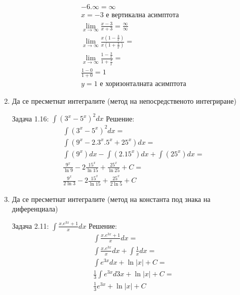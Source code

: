 \documentclass[a4paper, 20pt, fleqn, border=2pt]{article}
\begin{document}
\begin{enumerate}
\begin{equation}
\begin{split}
    -6.\infty = \infty \\
    x = -3 \text{ е вертикална асимптота} \\
    \lim_{x\to\infty}\frac{x - 3}{x + 3} = \frac{\infty}{\infty} \\
    \lim_{x\to\infty}\frac{x(1 - \frac{3}{x})}{x(1 + \frac{3}{x})} = \\
    \lim_{x\to\infty}\frac{1 - \frac{3}{x}}{1 + \frac{3}{x}} = \\
    \frac{1 - 0}{1 + 0} = 1 \\
    y = 1 \text{ е хоризонталната асимптота}
\end{split}
\end{equation}



    \item Да се пресметнат интегралите (метод на непосредственото интегриране)
\par
\par

Задача 1.16: $\int(3^x - 5^x)^2 dx$
Решение:
\begin{equation}
\begin{split}
    \int(3^x - 5^x)^2 dx = \\
    \int(9^x - 2.3^x.5^x + 25^x) dx = \\
    \int(9^x) dx - \int(2.15^x) dx + \int(25^x) dx = \\
    \frac{9^x}{\ln{9}} - 2\frac{15^x}{\ln{15}} + \frac{25^x}{\ln{25}} + C = \\
    \frac{9^x}{2\ln{3}} - 2\frac{15^x}{\ln{15}} + \frac{25^x}{2\ln{5}} + C
\end{split}
\end{equation}


    \item Да се пресметнат интегралите (метод на константа под знака на диференциала)
\par
\par

Задача 2.11: $\int\frac{x.e^{3x} + 1}{x} dx$
Решение:
\begin{equation}
\begin{split}
    \int\frac{x.e^{3x} + 1}{x}dx = \\
    \int\frac{x.e^{3x}}{x}dx + \int\frac{1}{x}dx = \\
    \int e^{3x}dx + \ln{|x|} + C = \\
    \frac{1}{3}\int e^{3x}d3x + \ln{|x|} + C = \\
    \frac{1}{3}e^{3x} + \ln{|x|} + C
\end{split}
\end{equation}



\end{enumerate}
\end{document}
